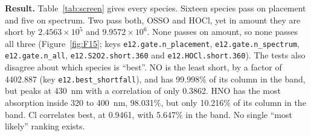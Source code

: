 \textbf{Result.} Table~\ref{tab:screen} gives every species. Sixteen species pass on
placement and five on spectrum. Two pass both, OSSO
and HOCl, yet in amount they are short by $2.4563\times10^{5}$ and $9.9572\times10^{6}$. None passes on amount, so none passes all three
(Figure~\ref{fig:F15}; keys \texttt{e12.gate.n\_placement}, \texttt{e12.gate.n\_spectrum},
\texttt{e12.gate.n\_all}, \texttt{e12.S2O2.short.360} and \texttt{e12.HOCl.short.360}). The tests also
disagree about which species is ``best''. NO is the least short, by a factor of
4402.887 (key \texttt{e12.best\_shortfall}), and has 99.998\% of its column in the band, but peaks at
430~nm with a correlation of only 0.3862. HNO has the most absorption inside 320 to
400~nm, 98.031\%, but only 10.216\% of its column in the band. Cl correlates best,
at 0.9461, with 5.647\% in the band. No single ``most likely'' ranking exists.

